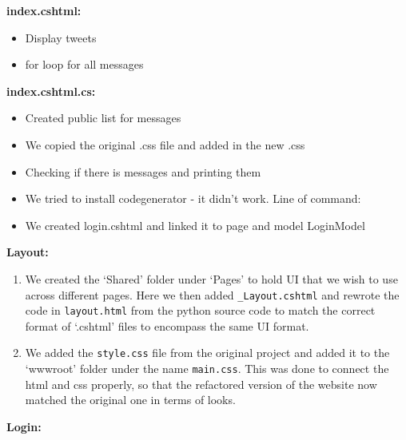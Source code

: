 \textbf{index.cshtml:}

\begin{itemize}
    \item Display tweets
    \item for loop for all messages
\end{itemize}

\textbf{index.cshtml.cs:}

\begin{itemize}
    \item Created public list for messages
    \item We copied the original .css file and added in the new .css
    \item Checking if there is messages and printing them
    \item We tried to install codegenerator - it didn't work. Line of command:
    \item We created login.cshtml and linked it to page and model LoginModel
\end{itemize}

\textbf{Layout:}

\begin{enumerate}
    \item We created the `Shared' folder under `Pages' to hold UI that we wish to use across different pages. Here we then added \texttt{\_Layout.cshtml} and rewrote the code in \texttt{layout.html} from the python source code to match the correct format of `.cshtml' files to encompass the same UI format.
    \item We added the \texttt{style.css} file from the original project and  added it to the `wwwroot' folder under the name \texttt{main.css}.  This was done to connect the html and css properly, so that the refactored version of the website now matched the original one in terms of looks.
\end{enumerate}

\textbf{Login:}

